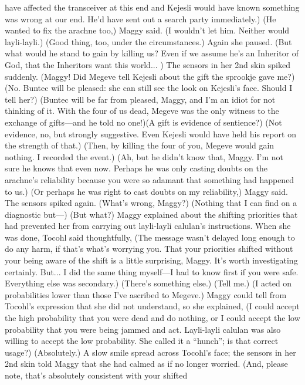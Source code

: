 \documentclass[9pt]{article}
\begin{document}
have affected the transceiver at this end and Kejesli would have known something was wrong at our end.
He’d have sent out a search party immediately.)
(He wanted to fix the arachne too,) Maggy said. (I wouldn’t let him. Neither would layli-layli.)
(Good thing, too, under the circumstances.) Again she paused. (But what would he stand to gain by
killing us? Even if we assume he’s an Inheritor of God, that the Inheritors want this world... ) The
sensors in her 2nd skin spiked suddenly. (Maggy! Did Megeve tell Kejesli about the gift the sprookje
gave me?)
(No. Buntec will be pleased: she can still see the look on Kejesli’s face. Should I tell her?)
(Buntec will be far from pleased, Maggy, and I’m an idiot for not thinking of it. With the four of us
dead, Megeve was the only witness to the exchange of gifts—and he told no one!)(A gift is evidence of sentience?)
(Not evidence, no, but strongly suggestive. Even Kejesli would have held his report on the strength of
that.)
(Then, by killing the four of you, Megeve would gain nothing. I recorded the event.)
(Ah, but he didn’t know that, Maggy. I’m not sure he knows that even now. Perhaps he was only
casting doubts on the arachne’s reliability because you were so adamant that something had happened to
us.)
(Or perhaps he was right to cast doubts on my reliability,) Maggy said.
The sensors spiked again. (What’s wrong, Maggy?)
(Nothing that I can find on a diagnostic but—)
(But what?)
Maggy explained about the shifting priorities that had prevented her from carrying out layli-layli
calulan’s instructions.
When she was done, Tocohl said thoughtfully, (The message wasn’t delayed long enough to do any
harm, if that’s what’s worrying you. That your priorities shifted without your being aware of the shift is a
little surprising, Maggy. It’s worth investigating certainly. But... I did the same thing myself—I had to
know first if you were safe. Everything else was secondary.)
(There’s something else.)
(Tell me.)
(I acted on probabilities lower than those I’ve ascribed to Megeve.) Maggy could tell from Tocohl’s
expression that she did not understand, so she explained, (I could accept the high probability that you
were dead and do nothing, or I could accept the low probability that you were being jammed and act.
Layli-layli calulan was also willing to accept the low probability. She called it a “hunch”; is that correct
usage?)
(Absolutely.) A slow smile spread across Tocohl’s face; the sensors in her 2nd skin told Maggy that
she had calmed as if no longer worried. (And, please note, that’s absolutely consistent with your shifted
\end{document}
